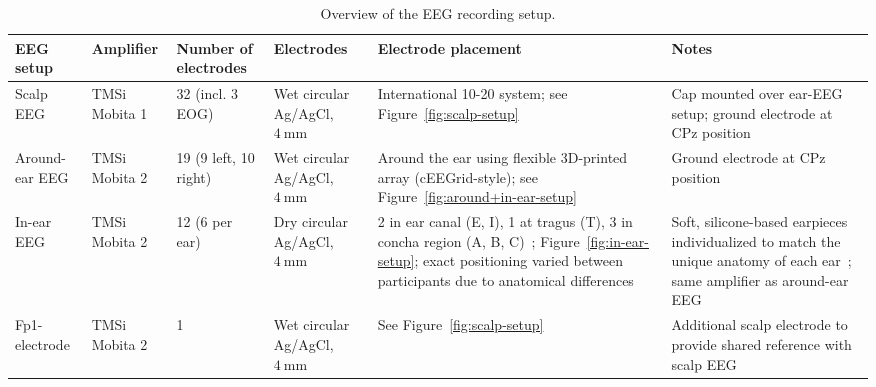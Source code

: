 \documentclass[fleqn,10pt]{wlscirep}
\begin{document}
	\begin{table}
		\centering
		\caption{Overview of the EEG recording setup.}
		\label{tab:eeg-setup}
		\renewcommand{\arraystretch}{1.5}
		\begin{tabular}{@{}lp{1.4cm}p{2.2cm}p{1.8cm}p{4cm}p{3.6cm}@{}}
			\toprule
			\textbf{EEG setup} & \textbf{Amplifier} &  \textbf{Number of} \newline \textbf{electrodes} & \textbf{Electrodes} & \textbf{Electrode placement} & \textbf{Notes} \\ \midrule
			Scalp EEG         & TMSi \newline Mobita 1 & 32 \newline(incl. 3 EOG)              & Wet circular \newline Ag/AgCl, \diameter $\SI{4}{\milli\meter}$           & International 10-20 system; see Figure~\ref{fig:scalp-setup} & Cap mounted over ear-EEG setup; ground electrode at CPz position \\
			Around-ear EEG    & TMSi \newline Mobita 2 & 19 \newline(9 left, 10 right)         & Wet circular \newline Ag/AgCl, \diameter $\SI{4}{\milli\meter}$            & Around the ear using flexible 3D-printed array (cEEGrid-style); see Figure~\ref{fig:around+in-ear-setup} & Ground electrode at CPz position \\
			In-ear EEG        & TMSi \newline Mobita 2 & 12 \newline(6 per ear)                & Dry circular \newline Ag/AgCl, \diameter $\SI{4}{\milli\meter}$             & 2 in ear canal (E, I), 1 at tragus (T), 3 in concha region (A, B, C)~\cite{kidmose2013study}; Figure~\ref{fig:in-ear-setup}; exact positioning varied between participants due to anatomical differences & Soft, silicone-based earpieces individualized to match the unique anatomy of each ear~\cite{kappel2019dry}; same amplifier as around-ear EEG \\
			Fp1-electrode     & TMSi \newline Mobita 2 & 1                & Wet circular \newline Ag/AgCl, \diameter $\SI{4}{\milli\meter}$             & See Figure~\ref{fig:scalp-setup} & Additional scalp electrode to provide shared reference with scalp EEG \\
			\bottomrule
		\end{tabular}
		\renewcommand{\arraystretch}{1}
	\end{table}
	
\end{document}
